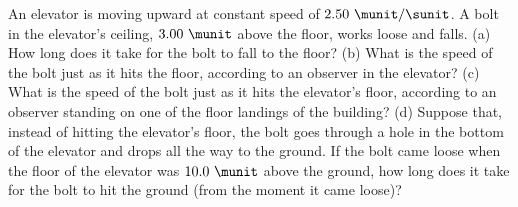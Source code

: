%
An elevator is moving upward at constant speed of 
$2.50\ \munit/\sunit$. A bolt in the elevator's ceiling, $3.00\ \munit$ above the
floor, works loose and falls.
%
(a) How long does it take for the bolt to fall to the
floor?\answercheck\hwendpart
%
(b) What is the speed of the bolt just as it hits the floor,
according to an observer in the elevator?\answercheck\hwendpart
%
(c) What is the speed of the bolt just as it hits the elevator's floor,
according to an observer standing on one of the floor landings of the
building?\answercheck\hwendpart
%
(d) Suppose that, instead of hitting the elevator's floor, the bolt goes
through a hole in the bottom of the elevator and drops all the way to
the ground. If the bolt came loose when the floor of the elevator was
$10.0\ \munit$ above the ground, how long does it take for the bolt to hit
the ground (from the moment it came loose)?\answercheck
